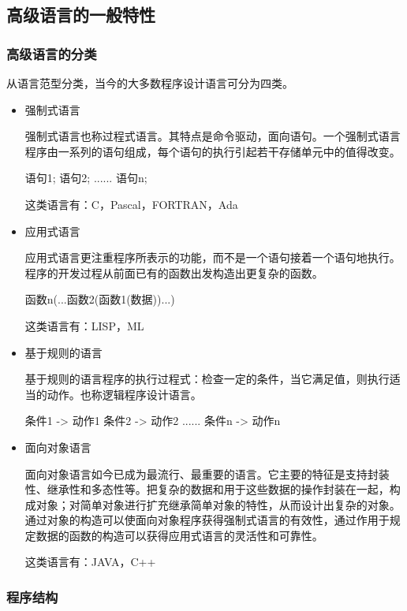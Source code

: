 \subsection{高级语言的一般特性}
\subsubsection{高级语言的分类}

从语言范型分类，当今的大多数程序设计语言可分为四类。
\begin{itemize}
\item 强制式语言

强制式语言也称过程式语言。其特点是命令驱动，面向语句。一个强制式语言程序由一系列的语句组成，每个语句的执行引起若干存储单元中的值得改变。

\begin{C++}
语句1;
语句2;
......
语句n;
\end{C++}

这类语言有：C，Pascal，FORTRAN，Ada

\item 应用式语言

应用式语言更注重程序所表示的功能，而不是一个语句接着一个语句地执行。程序的开发过程从前面已有的函数出发构造出更复杂的函数。

\begin{C++}
函数n(...函数2(函数1(数据))...)
\end{C++}

这类语言有：LISP，ML
\item 基于规则的语言

基于规则的语言程序的执行过程式：检查一定的条件，当它满足值，则执行适当的动作。也称逻辑程序设计语言。

\begin{C++}
条件1 -> 动作1
条件2 -> 动作2
......
条件n -> 动作n
\end{C++}

\item 面向对象语言

面向对象语言如今已成为最流行、最重要的语言。它主要的特征是支持封装性、继承性和多态性等。把复杂的数据和用于这些数据的操作封装在一起，构成对象；对简单对象进行扩充继承简单对象的特性，从而设计出复杂的对象。通过对象的构造可以使面向对象程序获得强制式语言的有效性，通过作用于规定数据的函数的构造可以获得应用式语言的灵活性和可靠性。

这类语言有：JAVA，C++
\end{itemize}

\subsubsection{程序结构}

